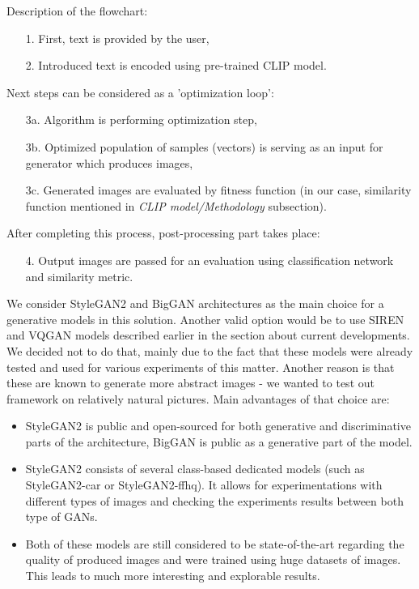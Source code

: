 \documentclass[11pt,a4paper,openany]{book}
\begin{document}
\noindent Description of the flowchart:
\begin{enumerate}
\item [1.] First, text is provided by the user,
\item [2.] Introduced text is encoded using pre-trained CLIP model.
\end{enumerate}
Next steps can be considered as a 'optimization loop':
\begin{enumerate}
\item [3a.] Algorithm is performing optimization step,
\item [3b.] Optimized population of samples (vectors)  is serving as an input for generator which produces images,
\item [3c.] Generated images are evaluated by fitness function (in our case, similarity function mentioned in \textit{CLIP model/Methodology} subsection).
\end{enumerate}
\noindent After completing this process, post-processing part takes place:
\begin{enumerate}
\item [4.] Output images are passed for an evaluation using classification network and similarity metric.
\end{enumerate}

We consider StyleGAN2 and BigGAN architectures as the main choice for a generative models in this solution. Another valid option would be to use SIREN and VQGAN models described earlier in the section about current developments. We decided not to do that, mainly due to the fact that these models were already tested and used for various experiments of this matter. Another reason is that these are known to generate more abstract images - we wanted to test out framework on relatively natural pictures.  Main advantages of that choice are:
\begin{itemize}
\item StyleGAN2 is public and open-sourced for both generative and discriminative parts of the architecture, BigGAN is public as a generative part of the model. 
\item StyleGAN2 consists of several class-based dedicated models (such as StyleGAN2-car or StyleGAN2-ffhq). It allows for experimentations with different types of images and checking the experiments results between both type of GANs.
\item Both of these models are still considered to be state-of-the-art regarding the quality of produced images and were trained using huge datasets of images. This leads to much more interesting and explorable results.
\end{itemize}
\end{document}
